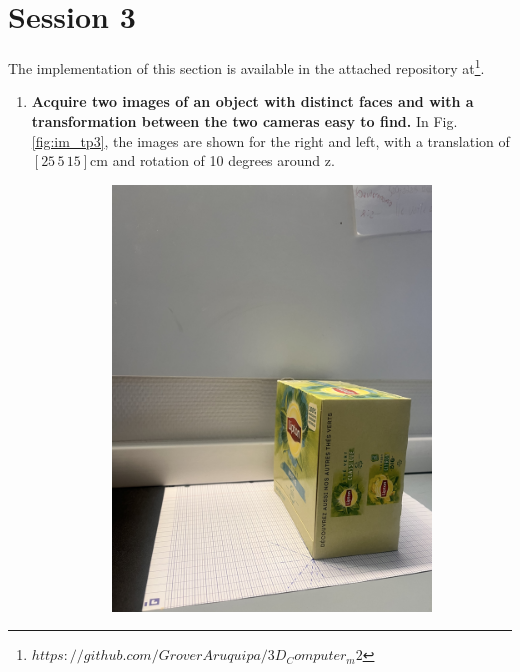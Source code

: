 \documentclass[12pt, twoside]{report}
\begin{document}
\chapter{Session 3}
The implementation of this section is available in the attached repository at\footnote{\href{https://github.com/GroverAruquipa/3D_Computer_m2}{$https://github.com/GroverAruquipa/3D_Computer_m2$}}.
\begin{enumerate}
    \item \textbf{Acquire two images of an object with distinct faces and with a
transformation between the two cameras easy to find.}
In Fig. \ref{fig:im_tp3}, the images are shown for the right and left, with a translation of $[25\, 5 \, 15]$cm and rotation of 10 degrees around z.

\begin{figure}[H]
     \centering
     \begin{subfigure}[b]{0.4\textwidth}
         \centering
         \includegraphics[width=\textwidth]{images/tp_3/img2l.jpg}

\end{subfigure}
\end{figure}
\end{enumerate}
\end{document}
